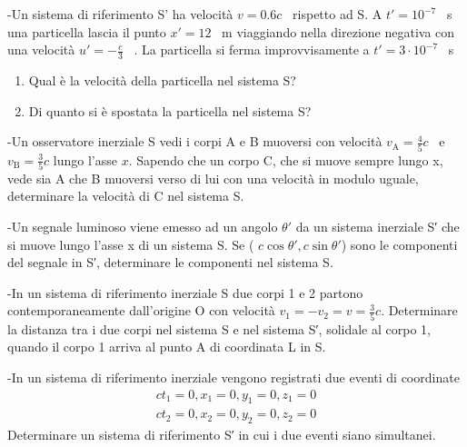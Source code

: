 \documentclass[12pt,twoside,a4]{article}
\begin{document}
\newpage
\begin{esercizio}
	-Un sistema di riferimento S' ha velocità $v=0.6c$ \ rispetto ad S. A $t' = 10^{-7} $ \ s una particella lascia il punto $x'= 12$ \ m viaggiando nella direzione negativa con una velocità $u'= - \frac{c}{3}$ \ . La particella si ferma improvvisamente a $t'=3\cdot 10^{-7}$ \ s 
\begin{enumerate}[label=(\textit{\roman*})]
		\item Qual è la velocità della particella nel sistema S?
		\item Di quanto si è spostata la particella nel sistema S?
	\end{enumerate}
 
\end{esercizio}


\begin{esercizio}
	-Un osservatore inerziale S vedi i corpi A e B muoversi con velocità  $v_{\mathrm{A}}=\frac{4}{5}c$ \ e \ $v_{\mathrm{B}}=\frac{3}{5}c$ lungo l'asse $x$. Sapendo che un corpo C, che si muove sempre lungo x, vede sia A che B muoversi verso di lui con una velocità  in modulo uguale, determinare la velocità  di C nel sistema S.
\end{esercizio}

\begin{esercizio}
	-Un segnale luminoso viene emesso ad un angolo $\theta '$ da un sistema inerziale S′ che si muove lungo l'asse x di un sistema S. Se ( $c \cos \theta', c \sin \theta '$) sono le componenti del segnale in S′, determinare le componenti nel sistema S.
\end{esercizio}

\begin{esercizio}
	-In un sistema di riferimento inerziale S due corpi 1 e 2 partono contemporaneamente dall'origine O con velocità  $v_1=-v_2=v=\frac{3}{5}c$. Determinare la distanza tra i due corpi nel sistema S e nel sistema S′, solidale al corpo 1, quando il corpo 1 arriva al punto A di coordinata L in S.
\end{esercizio}

\begin{esercizio}
	-In un sistema di riferimento inerziale vengono registrati due eventi di coordinate
	\begin{gather*} 
		ct_1=0 , x_1=0, y_1=0, z_1=0 \\
		ct_2=0 , x_2=0, y_2=0, z_2=0 
	\end{gather*}
	Determinare un sistema di riferimento S′ in cui i due eventi siano simultanei.
\end{esercizio}
\end{document}
